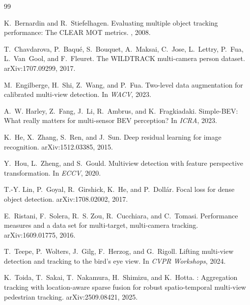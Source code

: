 \documentclass[10pt,twocolumn,letterpaper]{article}
\begin{document}
{\small
\begin{thebibliography}{99}

K.~Bernardin and R.~Stiefelhagen.
\newblock Evaluating multiple object tracking performance: The {CLEAR MOT} metrics.
, 2008.

T.~Chavdarova, P.~Baqu\'e, S.~Bouquet, A.~Maksai, C.~Jose, L.~Lettry, P.~Fua, L.~Van~Gool, and F.~Fleuret.
\newblock The {WILDTRACK} multi-camera person dataset.
\newblock arXiv:1707.09299, 2017.

M.~Engilberge, H.~Shi, Z.~Wang, and P.~Fua.
\newblock Two-level data augmentation for calibrated multi-view detection.
\newblock In {\em WACV}, 2023.

A.~W. Harley, Z.~Fang, J.~Li, R.~Ambrus, and K.~Fragkiadaki.
\newblock Simple-{BEV}: What really matters for multi-sensor {BEV} perception?
\newblock In {\em ICRA}, 2023.

K.~He, X.~Zhang, S.~Ren, and J.~Sun.
\newblock Deep residual learning for image recognition.
\newblock arXiv:1512.03385, 2015.

Y.~Hou, L.~Zheng, and S.~Gould.
\newblock Multiview detection with feature perspective transformation.
\newblock In {\em ECCV}, 2020.

T.-Y. Lin, P.~Goyal, R.~Girshick, K.~He, and P.~Doll\'ar.
\newblock Focal loss for dense object detection.
\newblock arXiv:1708.02002, 2017.

E.~Ristani, F.~Solera, R.~S. Zou, R.~Cucchiara, and C.~Tomasi.
\newblock Performance measures and a data set for multi-target, multi-camera tracking.
\newblock arXiv:1609.01775, 2016.

T.~Teepe, P.~Wolters, J.~Gilg, F.~Herzog, and G.~Rigoll.
\newblock Lifting multi-view detection and tracking to the bird's eye view.
\newblock In {\em CVPR Workshops}, 2024.

K.~Toida, T.~Sakai, T.~Nakamura, H.~Shimizu, and K.~Hotta.
: Aggregation tracking with location-aware sparse fusion for robust spatio-temporal
multi-view pedestrian tracking.
\newblock arXiv:2509.08421, 2025.

\end{thebibliography}
}
\end{document}
